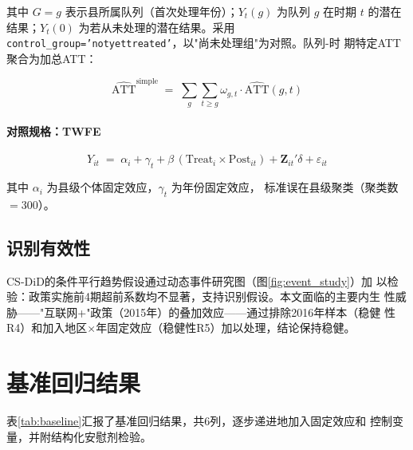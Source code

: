 \documentclass[12pt, a4paper]{article}
\begin{document}
其中 $G=g$ 表示县所属队列（首次处理年份）；$Y_t(g)$ 为队列 $g$ 在时期
$t$ 的潜在结果；$Y_t(0)$ 为若从未处理的潜在结果。采用
\texttt{control\_group='notyettreated'}，以"尚未处理组"为对照。队列-时
期特定ATT聚合为加总ATT：

\begin{equation}
\widehat{\text{ATT}}^{\text{simple}} \;=\;
\sum_{g}\sum_{t\geq g}\omega_{g,t}\cdot\widehat{\text{ATT}}(g,t)
\end{equation}

\paragraph{对照规格：TWFE}

\begin{equation}
Y_{it} \;=\; \alpha_i + \gamma_t + \beta\,(\text{Treat}_i\times\text{Post}_{it})
         + \mathbf{Z}_{it}'\delta + \varepsilon_{it}
\end{equation}

其中 $\alpha_i$ 为县级个体固定效应，$\gamma_t$ 为年份固定效应，
标准误在县级聚类（聚类数$=300$）。

\subsection{识别有效性}

CS-DiD的条件平行趋势假设通过动态事件研究图（图\ref{fig:event_study}）加
以检验：政策实施前4期超前系数均不显著，支持识别假设。本文面临的主要内生
性威胁——"互联网+"政策（2015年）的叠加效应——通过排除2016年样本（稳健
性R4）和加入地区$\times$年固定效应（稳健性R5）加以处理，结论保持稳健。

\section{基准回归结果}

表\ref{tab:baseline}汇报了基准回归结果，共6列，逐步递进地加入固定效应和
控制变量，并附结构化安慰剂检验。
\end{document}
